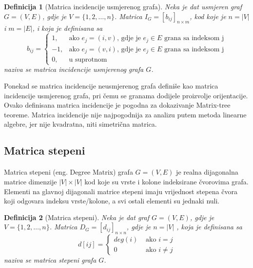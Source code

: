 \documentclass[11pt]{article}
\newtheorem{definition}{Definicija}
\begin{document}
			\begin{definition}[Matrica incidencije usmjerenog grafa] 
			Neka je dat usmjeren graf $G = (V, E)$, gdje je $V = \{1, 2, \dots, n\}$. Matrica $I_G = [b_{ij}]_{n \times m}$, kod koje je $n = |V|$ i $m = |E|$, i koja je definisana sa
			 \[
				 b_{ij} =
				 \begin{cases}
				 1, & \text{ako } e_j = (i,v) \text{, gdje je } e_j \in E \text{ grana sa indeksom j} \\
				-1, & \text{ako } e_j = (v,i) \text{, gdje je } e_j \in E \text{ grana sa indeksom j} \\
				 0, & \text{u suprotnom}
				 \end{cases}
			 \]
			naziva se matrica incidencije usmjerenog grafa $G$.
			\end{definition}
	
			Ponekad se matrica incidencije neusmjerenog grafa definiše kao matrica incidencije usmjerenog grafa, pri čemu se granama dodijele proizvolje orijentacije. 
			Ovako definisana matrica incidencije je pogodna za dokazivanje Matrix-tree teoreme.
			Matrica incidencije nije najpogodnija za analizu putem metoda linearne algebre, jer nije kvadratna, niti simetrična matrica.
	
		\subsection{Matrica stepeni}
		\paragraph{}
		Matrica stepeni (eng. Degree Matrix) grafa $G = (V, E)$ je realna dijagonalna matrice dimenzije $|V| \times |V|$ kod koje su vrste i kolone indeksirane čvorovima grafa.
		Elementi na glavnoj dijagonali matrice stepeni imaju vrijednost stepena čvora koji odgovara indeksu vrste/kolone, a svi ostali elementi su jednaki nuli. 
	
			\begin{definition}[Matrica stepeni] 
			Neka je dat graf $G = (V, E)$, gdje je $V = \{1, 2, \dots, n\}$. Matrica $D_G = [d_{ij}]_{n \times n}$, gdje je $n = |V|$ , koja je definisana sa
			\[
				d[ij] = 
				 \begin{cases}
				 deg(i) & \text{ ako } i = j  \\ 
				 0  & \text{ ako } i \neq j 
				 \end{cases}
			\]
			naziva se matrica stepeni grafa $G$.
			\end{definition}
\end{document}

